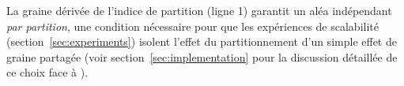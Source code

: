 La graine dérivée de l'indice de partition (ligne 1) garantit un aléa
indépendant \emph{par partition}, une condition nécessaire pour que les
expériences de scalabilité (section~\ref{sec:experiments}) isolent l'effet
du partitionnement d'un simple effet de graine partagée (voir
section~\ref{sec:implementation} pour la discussion détaillée de ce choix
face à ).
